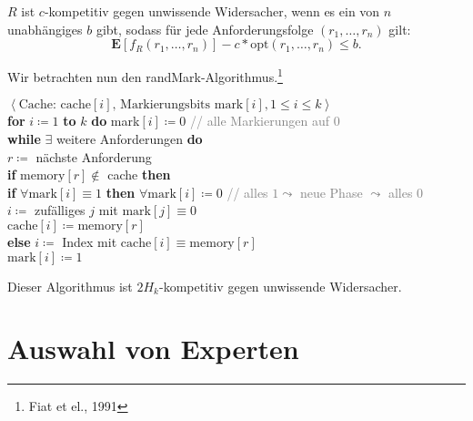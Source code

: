 \begin{definition}
  \( R \) ist \( c \)-kompetitiv gegen unwissende Widersacher, wenn es ein von \( n \) unabhängiges \( b \) gibt, sodass für jede Anforderungsfolge \( (r_1,\dots,r_n ) \) gilt:
  \begin{equation*}
    \textbf{E}[f_R(r_1,\dots,r_n)]-c*\text{opt}(r_1,\dots,r_n) \leq b\text{.}
  \end{equation*}
\end{definition}

Wir betrachten nun den randMark-Algorithmus.\footnote{Fiat et el., 1991}

\begin{pseudocode}
  \( \left\langle \text{Cache: cache}[i]\text{, Markierungsbits mark}[i], 1 \leq i \leq k \right\rangle \) \\
  \textbf{for} \( i \coloneqq 1 \) \textbf{to} \( k \) \textbf{do} mark\( [i] \coloneqq 0 \) \enskip \textcolor{gray}{// alle Markierungen auf \( 0 \)} \\
  \textbf{while} \( \exists \) weitere Anforderungen \textbf{do} \\
  \phantom{\enskip} \( r \coloneqq \) nächste Anforderung \\
  \phantom{\enskip} \textbf{if} \( \text{memory}[r] \not \in \) cache \textbf{then} \\
  \phantom{\enskip} \phantom{\enskip} \textbf{if} \( \forall \text{mark}[i] \equiv 1 \) \textbf{then} \( \forall \text{mark}[i] \coloneqq 0 \) \enskip \textcolor{gray}{// alles \( 1 \leadsto \) neue Phase \( \leadsto \) alles \( 0 \)} \\
  \phantom{\enskip} \phantom{\enskip} \( i \coloneqq \) zufälliges \( j \) mit \( \text{mark}[j] \equiv 0 \) \\
  \phantom{\enskip} \phantom{\enskip} \( \text{cache}[i] \coloneqq \text{memory}[r] \) \\
  \phantom{\enskip} \textbf{else} \( i \coloneqq \) Index mit \( \text{cache}[i] \equiv \text{memory}[r] \) \\
  \( \text{mark}[i] \coloneqq 1 \)

\end{pseudocode}

Dieser Algorithmus ist \( 2H_k \)-kompetitiv gegen unwissende Widersacher.

\section{Auswahl von Experten}

